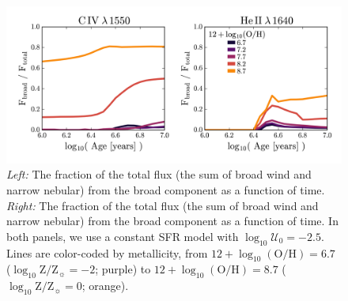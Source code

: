 \documentclass[preprint2]{aastex62}
\newcommand{\heii}{\ion{He}{2}}
\newcommand{\civ}{\ion{C}{4}}
\newcommand{\logten}{\ensuremath{\log_{10}}}
\newcommand{\logOH}{\ensuremath{\logten (\mathrm{O}/\mathrm{H})}\xspace}
\newcommand{\logZeq}[1]{\ensuremath{\logten \mathrm{Z}/\mathrm{Z}_{\sun} = #1}}
\newcommand{\logUeq}[1]{\ensuremath{\logten \mathcal{U}_0 = #1}}
\begin{document}
\begin{figure}
  \begin{center}
    \includegraphics[width=\linewidth]{figs/f7.png}
    \caption{\emph{Left:} The fraction of the total \civ{} flux (the sum of broad wind and narrow nebular) from the broad component as a function of time.  \emph{Right:} The fraction of the total \heii{} flux (the sum of broad wind and narrow nebular) from the broad component as a function of time. In both panels, we use a constant SFR model with \logUeq{-2.5}. Lines are color-coded by metallicity, from $12+\logOH=6.7$ (\logZeq{-2}; purple) to $12+\logOH=8.7$ (\logZeq{0}; orange).}
    \label{fig:FracBroad}
  \end{center}
\end{figure}
\end{document}
